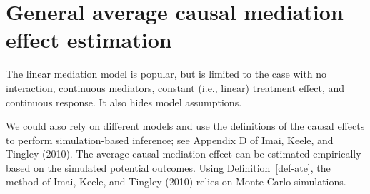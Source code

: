\documentclass[
  11pt,
  letterpaper,
]{scrbook}
\theoremstyle{definition}
\theoremstyle{definition}
\theoremstyle{remark}
\begin{document}
\section{General average causal mediation effect
estimation}\label{general-average-causal-mediation-effect-estimation}

The linear mediation model is popular, but is limited to the case with
no interaction, continuous mediators, constant (i.e., linear) treatment
effect, and continuous response. It also hides model assumptions.

We could also rely on different models and use the definitions of the
causal effects to perform simulation-based inference; see Appendix D of
Imai, Keele, and Tingley (2010). The average causal mediation effect can
be estimated empirically based on the simulated potential outcomes.
Using Definition~\ref{def-ate}, the method of Imai, Keele, and Tingley
(2010) relies on Monte Carlo simulations.
\end{document}
